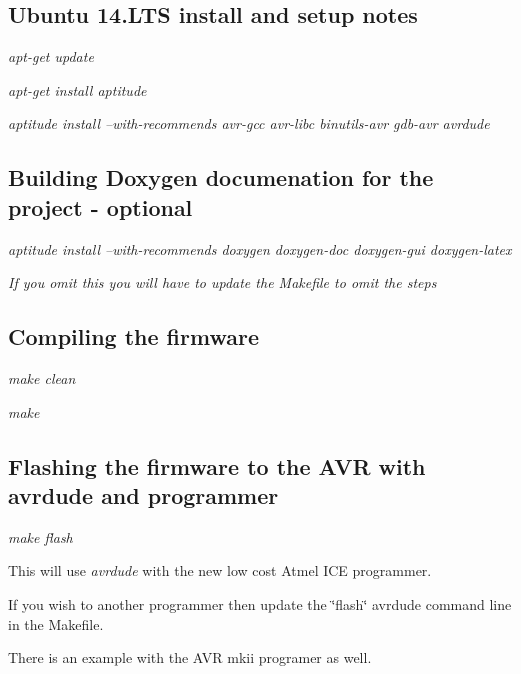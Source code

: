 \subsection*{Ubuntu 14.\-L\-T\-S install and setup notes}


\begin{DoxyItemize}
\item {\itshape apt-\/get update}
\item {\itshape apt-\/get install aptitude}
\item {\itshape aptitude install --with-\/recommends avr-\/gcc avr-\/libc binutils-\/avr gdb-\/avr avrdude}
\end{DoxyItemize}

\subsection*{Building Doxygen documenation for the project -\/ optional}


\begin{DoxyItemize}
\item {\itshape aptitude install --with-\/recommends doxygen doxygen-\/doc doxygen-\/gui doxygen-\/latex}
\item {\itshape If you omit this you will have to update the Makefile to omit the steps}
\end{DoxyItemize}

\subsection*{Compiling the firmware}


\begin{DoxyItemize}
\item {\itshape make clean}
\item {\itshape make}
\end{DoxyItemize}

\subsection*{Flashing the firmware to the A\-V\-R with avrdude and programmer}


\begin{DoxyItemize}
\item {\itshape make flash}
\begin{DoxyItemize}
\item This will use {\itshape avrdude} with the new low cost Atmel I\-C\-E programmer.
\begin{DoxyItemize}
\item If you wish to another programmer then update the \char`\"{}flash\char`\"{} avrdude command line in the Makefile.
\item There is an example with the A\-V\-R mkii programer as well. 
\end{DoxyItemize}
\end{DoxyItemize}
\end{DoxyItemize}